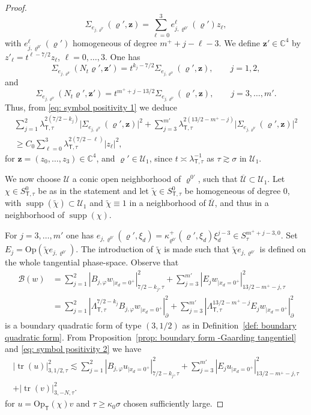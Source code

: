 \documentclass[JEP,XML,SOM,Unicode,published]{cedram}
\theoremstyle{plain}
\theoremstyle{definition}
\def\C{\mathbb{C}}
\newcommand{\nhd}{neighborhood\xspace}
\newcommand{\suff}{sufficiently\xspace}
\let\k\kappa
\let\y\varrho
\newcommand{\tchi}{\tilde{\chi}}
\newcommand{\ovl}[1]{\overline{#1}}
\newcommand{\un}[1]{\Sigma_{#1}}
\newcommand{\U}{\mathscr U}
\newcommand{\z}{\boldsymbol{z}}
\newcommand{\br}{\ensuremath{_{|x_d=0^+}}}
\newcommand{\Op}{\ensuremath{\mathrm{Op}}}
\newcommand{\Opt}{\ensuremath{\mathrm{Op}_{\scriptscriptstyle{\mathsf{T}}}}}
\newcommand{\norm}[2]{{|#1|}_{#2}}
\newcommand{\normsc}[2]{{| #1 |}_{#2, \tau}}
\newcommand{\lsct}{\lambda_{{\scriptscriptstyle{\mathsf T}},\tau}}
\newcommand{\Lsct}{\Lambda_{{\scriptscriptstyle{\mathsf T}},\tau}}
\newcommand{\Ssc}{S_\tau}
\newcommand{\Ssct}{S_{{\scriptscriptstyle{\mathsf T}},\tau}}
\DeclareMathOperator{\supp}{supp}
\DeclareMathOperator{\trace}{tr}
\begin{document}
\begin{proof}
\begin{equation*}
\un{e_{j, \y^{0\prime}}} (\y', \z)= \sum_{\ell=0}^{3} e_{j,
\y^{0\prime}}^\ell (\y') z_\ell,
\end{equation*}
with $ e_{j, \y^{0\prime}}^\ell (\y')$ homogeneous of degree
$m^++j-\ell-3$.
We define $\z' \in \C^4$ by $z'_\ell = t^{\ell-7/2} z_\ell$, $\ell=0,
\dots, 3$.
One has
\begin{equation*}
\un{e_{j, \y^{0\prime}}} (N_t \y', \z')= t^{k_j-7/2} \un{e_{j,
\y^{0\prime}}} (\y', \z), \qquad j=1,2,
\end{equation*}
and
\begin{equation*}
\un{e_{j, \y^{0\prime}}} (N_t \y', \z')= t^{m^++j-13/2} \un{e_{j,
\y^{0\prime}}} (\y', \z), \qquad j=3,\dots,m'.
\end{equation*}
Thus, from \eqref{eq: symbol positivity 1} we deduce
\begin{multline}
\label{eq: symbol positivity 2}
\sum_{j=1}^{2} \lsct^{2(7/2-k_j)} \big|\un{e_{j, \y^{0\prime}}} (\y', \z)\big|^2
+ \sum_{j=3}^{m'} \lsct^{2(13/2-m^+-j)}
\big|\un{e_{j,\y^{0\prime}}} (\y', \z)\big|^2
\\[-10pt]
\geq
C_0 \sum_{\ell=0}^{3} \lsct^{2(7/2-\ell)}| z_\ell|^2,
\end{multline}
for $\z = (z_0, \dots, z_3) \in \C^{4}$, and $\y' \in \U_1$,
since $t \asymp \lsct^{-1}$ as $\tau \gtrsim \sigma$ in $\U_1$.

We now choose $\U$ a conic open neighborhood of $\y^{0\prime}$, such that
$\ovl{\U}\subset\U_1$. Let $\chi\in \Ssct^0$ be as in the statement and let $\tchi\in
\Ssct^0$ be homogeneous of degree $0$, with
$\supp(\tchi)\subset\U_1$ and $\tchi\equiv 1$ in a neighborhood of
$\ovl{\U}$, and thus in a \nhd of $\supp(\chi)$.

For $j=3, \dots, m'$ one has $e_{j, \y^{0\prime}}(\y',\xi_d) =
\k^+_{\y^{0\prime}} (\y',\xi_d) \xi_d^{j-3} \in \Ssc^{m^++j-3,0}$.
Set $E_{j} = \Op (\tchi e_{j, \y^{0\prime}})$. The introduction
of $\tchi$ is made such that $\tchi e_{j, \y^{0\prime}}$ is defined on
the whole tangential phase-space. Observe that
\begin{align*}
\mathscr B (w) &= \sum_{j=1}^{2} \normsc{B_{j, \varphi}w\br}{7/2-k_{j}}^2
+\sum_{j=3}^{m'} \normsc{E_{j}w\br}{13/2-m^+-j}^2\\
&=\sum_{j=1}^{2}
\norm{\Lsct^{7/2-k_{j}} B_{j, \varphi}w\br}{\partial}^2
+ \sum_{j=3}^{m'}
\norm{\Lsct^{13/2-m^+-j} E_{j}w\br}{\partial}^2
\end{align*}
is a boundary quadratic form of type $(3,1/2)$ as in
Definition~\ref{def: boundary quadratic form}.
From Proposition~\ref{prop: boundary form -Gaarding tangentiel} and
\eqref{eq: symbol positivity 2} we have
\begin{multline}
\label{eq: boundary inequality - est traces}
\normsc{\trace(u)}{3,1/2}^2
\lesssim \sum_{j=1}^{2} \normsc{B_{j, \varphi}u\br}{7/2-k_{j}}^2
+\sum_{j=3}^{m'} \normsc{E_{j}u\br}{13/2-m^+-j}^2\\
+ \normsc{\trace(v)}{3,-N}^2.
\end{multline}
for $u = \Opt(\chi) v$ and $\tau \geq \k_0 \sigma$ chosen \suff
large.


\end{proof}
\end{document}
